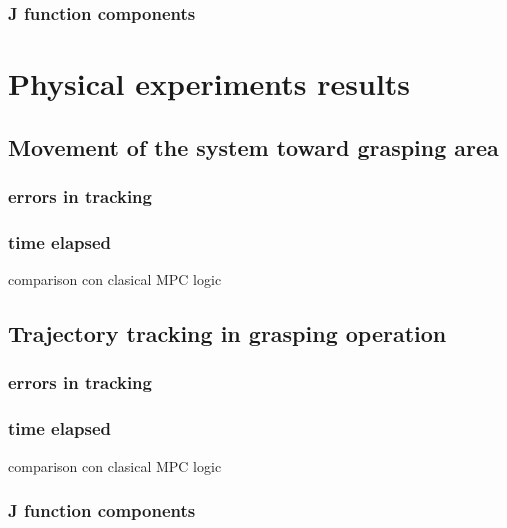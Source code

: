 		\subsubsection{J function components}
	
\section{Physical experiments results}
	
	\subsection{Movement of the system toward grasping area}

		\subsubsection{errors in tracking}
			
		\subsubsection{time elapsed}
			comparison con clasical MPC logic

	\subsection{Trajectory tracking in grasping operation}

		\subsubsection{errors in tracking}
			
		\subsubsection{time elapsed}
			comparison con clasical MPC logic
		\subsubsection{J function components}

